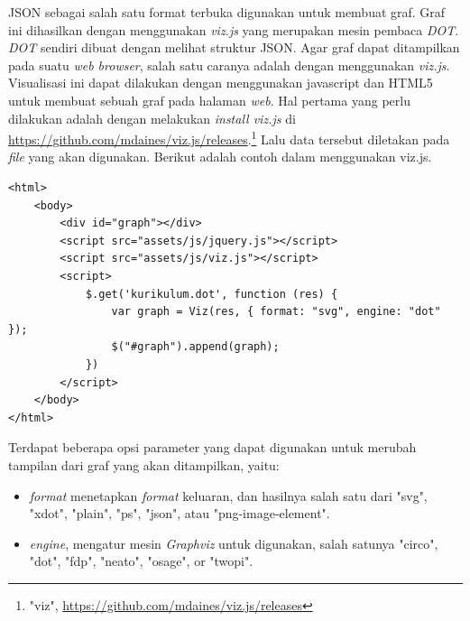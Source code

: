 JSON sebagai salah satu format terbuka digunakan untuk membuat graf. Graf ini dihasilkan dengan menggunakan \textit{viz.js} yang merupakan mesin pembaca \textit{DOT}. \textit{DOT} sendiri dibuat dengan melihat struktur JSON. Agar graf dapat ditampilkan pada suatu \textit{web browser}, salah satu caranya adalah dengan menggunakan \textit{viz.js}. Visualisasi ini dapat dilakukan dengan menggunakan javascript dan HTML5 untuk membuat sebuah graf pada halaman \textit{web}. Hal pertama yang perlu dilakukan adalah dengan melakukan
\textit{install viz.js} di \url{https://github.com/mdaines/viz.js/releases}.\footnote{"viz", \url{https://github.com/mdaines/viz.js/releases}} Lalu data tersebut
diletakan pada \textit{file} yang akan digunakan. Berikut adalah contoh dalam menggunakan viz.js.
\begin{lstlisting}
<html>
    <body>
        <div id="graph"></div>
        <script src="assets/js/jquery.js"></script>
        <script src="assets/js/viz.js"></script>
        <script>
            $.get('kurikulum.dot', function (res) {
                var graph = Viz(res, { format: "svg", engine: "dot" });
                $("#graph").append(graph);
            })
        </script>
    </body>
</html>
\end{lstlisting}

Terdapat beberapa opsi parameter yang dapat digunakan untuk merubah tampilan dari graf
yang akan ditampilkan, yaitu:
\begin{itemize}
\item \textit{format} menetapkan \textit{format} keluaran, dan hasilnya salah satu dari "svg", "xdot", "plain", "ps", "json", atau "png-image-element". 
\item \textit{engine}, mengatur mesin \textit{Graphviz} untuk digunakan, salah satunya "circo", "dot", "fdp", "neato", "osage", or "twopi".
\end{itemize}



